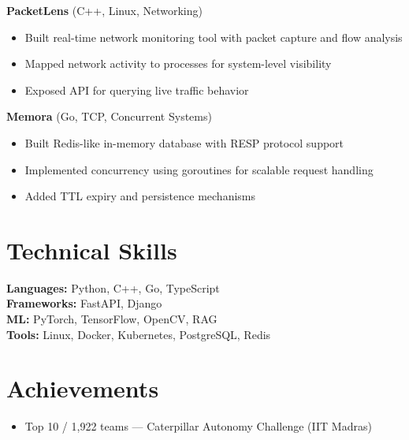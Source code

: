 \documentclass[letterpaper,11pt]{article}
\begin{document}
\textbf{PacketLens} (C++, Linux, Networking)
\begin{itemize}[noitemsep]
\item Built real-time network monitoring tool with packet capture and flow analysis
\item Mapped network activity to processes for system-level visibility
\item Exposed API for querying live traffic behavior
\end{itemize}

\textbf{Memora} (Go, TCP, Concurrent Systems)
\begin{itemize}[noitemsep]
\item Built Redis-like in-memory database with RESP protocol support
\item Implemented concurrency using goroutines for scalable request handling
\item Added TTL expiry and persistence mechanisms
\end{itemize}

\section{Technical Skills}
\textbf{Languages:} Python, C++, Go, TypeScript \\
\textbf{Frameworks:} FastAPI, Django \\
\textbf{ML:} PyTorch, TensorFlow, OpenCV, RAG \\
\textbf{Tools:} Linux, Docker, Kubernetes, PostgreSQL, Redis

\section{Achievements}
\begin{itemize}[noitemsep]
\item Top 10 / 1,922 teams — Caterpillar Autonomy Challenge (IIT Madras)
\end{itemize}
\end{document}
